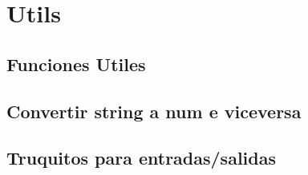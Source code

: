 \section{Utils}
\subsection{Funciones Utiles}

\subsection{Convertir string a num e viceversa}

\subsection{Truquitos para entradas/salidas}
